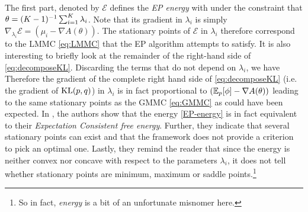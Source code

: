 %
%
The first part, denoted by $\mathcal E$ defines the \emph{EP energy} with
%
%
under the constraint that $\theta=(K-1)^{-1} \sum_{i=1}^{K}\lambda_i$. Note that its gradient in $\lambda_i$ is simply $\nabla_{\lambda_i}\mathcal E = (\mu_i-\nabla A(\theta))$. 
The stationary points of $\mathcal E$ in $\lambda_i$ therefore correspond to the LMMC \eqref{eq:LMMC} that the EP algorithm attempts to satisfy.
It is also interesting to briefly look at the remainder of the right-hand side of \eqref{eq:decomposeKL}. Discarding the terms that do not depend on $\lambda_i$, we have
%
%
Therefore the gradient of the complete right hand side of \eqref{eq:decomposeKL} (i.e. the gradient of $\mathrm{KL}\!\left(p,q\right)$) in $\lambda_i$ is in fact proportional to $(\mathbb E_{p}[\phi]-\nabla A(\theta))$ leading to the same stationary points as the GMMC \eqref{eq:GMMC} as could have been expected.
%
In \citet{heskes05}, the authors show that the energy \eqref{EP-energy} is in fact equivalent to their \emph{Expectation Consistent free energy}. Further, they indicate that several stationary points can exist and that the framework does not provide a criterion to pick an optimal one. Lastly, they remind the reader that since the energy is neither convex nor concave with respect to the parameters $\lambda_i$, it does not tell whether stationary points are minimum, maximum or saddle points.\footnote{So in fact, \emph{energy} is a bit of an unfortunate misnomer here.} %
%
